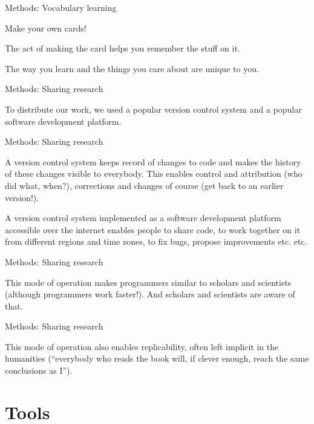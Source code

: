 \documentclass{beamer}
\begin{document}
\begin{frame}{Methods: Vocabulary learning}

\alert{Make your own cards!}

The act of making the card helps you remember the stuff on it.

The way you learn and the things you care about are unique to you.

\end{frame}

\begin{frame}{Methods: Sharing research}

To distribute our work, we used a popular version control system and a popular software development platform.

\end{frame}

\begin{frame}{Methods: Sharing research}

A \alert{version control system} keeps record of changes to code and makes the history of these changes visible to everybody. This enables control and attribution (who did what, when?), corrections and changes of course (get back to an earlier version!).

A version control system implemented \alert{as a software development platform} accessible over the internet enables people to share code, to work together on it from different regions and time zones, to fix bugs, propose improvements etc. etc.

\end{frame}

\begin{frame}{Methods: Sharing research}

This mode of operation makes programmers similar to scholars and scientists (although programmers work faster!). And scholars and scientists are aware of that.

\end{frame}

\begin{frame}{Methods: Sharing research}

This mode of operation also enables \alert{replicability}, often left implicit in the humanities (``everybody who reads the book will, if clever enough, reach the same conclusions as I'').

\end{frame}

\section{Tools}
\end{document}
